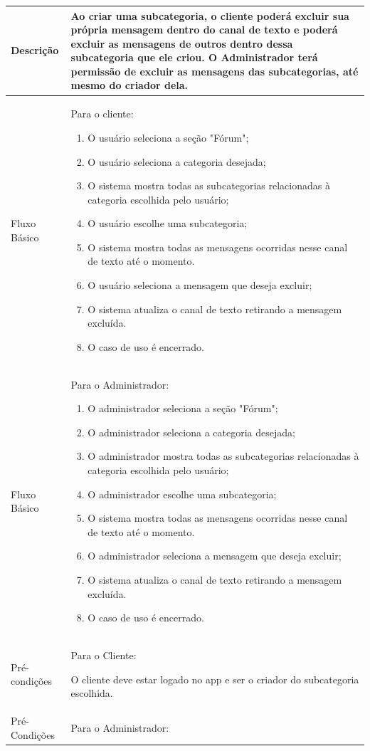 \begin{apendicesenv}
\begin{longtable}{|p{3.3cm}|p{12.3cm}|}
		Descrição & Ao criar uma subcategoria, o cliente poderá excluir sua própria mensagem dentro do canal de texto e poderá excluir as mensagens de outros dentro dessa subcategoria que ele criou. O Administrador terá permissão de excluir as mensagens das subcategorias, até mesmo do criador dela.\\
		\hline
		Fluxo Básico  & 
		Para o cliente:
		\begin{enumerate}
			\item O usuário seleciona a seção "Fórum";
			\item O usuário seleciona a categoria desejada;
			\item O sistema mostra todas as subcategorias relacionadas à categoria escolhida pelo usuário;
			\item O usuário escolhe uma subcategoria;
			\item O sistema mostra todas as mensagens ocorridas nesse canal de texto até o momento. 
			\item O usuário seleciona a mensagem que deseja excluir;
			\item O sistema atualiza o canal de texto retirando a mensagem excluída. 
			\item O  caso de uso é encerrado. 
		\end{enumerate}\\
		\hline
		Fluxo Básico  & 
		Para o Administrador:
		\begin{enumerate}
			\item O administrador seleciona a seção "Fórum";
			\item O administrador seleciona a categoria desejada;
			\item O administrador mostra todas as subcategorias relacionadas à categoria escolhida pelo usuário;
			\item O administrador escolhe uma subcategoria;
			\item O sistema mostra todas as mensagens ocorridas nesse canal de texto até o momento. 
			\item O administrador seleciona a mensagem que deseja excluir;
			\item O sistema atualiza o canal de texto retirando a mensagem excluída. 
			\item O caso de uso é encerrado. 
		\end{enumerate}\\
		\hline
		Pré-condições & Para o Cliente: 
		
		O cliente deve estar logado no app e ser o criador do subcategoria escolhida.\\
		\hline
		Pré-Condições & Para o Administrador:
		

\end{longtable}
\end{apendicesenv}
